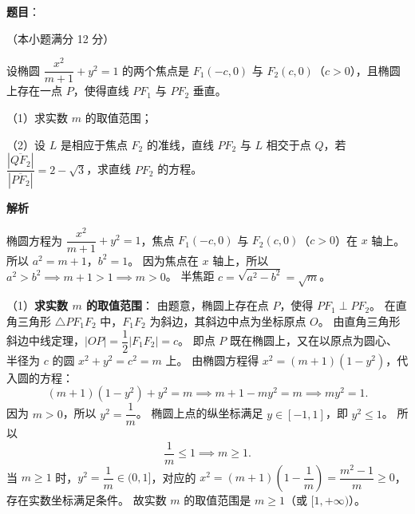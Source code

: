 \begin{answer}

\textbf{题目}：

（本小题满分 12 分）

设椭圆 $\dfrac{x^2}{m+1}+y^2=1$ 的两个焦点是 $F_1(-c,0)$ 与 $F_2(c,0)$（$c>0$），且椭圆上存在一点 $P$，使得直线 $PF_1$ 与 $PF_2$ 垂直。

（1）求实数 $m$ 的取值范围；

（2）设 $L$ 是相应于焦点 $F_2$ 的准线，直线 $PF_2$ 与 $L$ 相交于点 $Q$，若 $\dfrac{|\overline{QF_2}|}{|\overline{PF_2}|}=2-\sqrt{3}$，求直线 $PF_2$ 的方程。

\textbf{解析}

椭圆方程为 $\dfrac{x^2}{m+1}+y^2=1$，焦点 $F_1(-c,0)$ 与 $F_2(c,0)$（$c>0$）在 $x$ 轴上。
所以 $a^2=m+1$，$b^2=1$。
因为焦点在 $x$ 轴上，所以 $a^2>b^2 \implies m+1>1 \implies m>0$。
半焦距 $c=\sqrt{a^2-b^2}=\sqrt{m}$。

（1）\textbf{求实数 $m$ 的取值范围}：
由题意，椭圆上存在点 $P$，使得 $PF_1\perp PF_2$。
在直角三角形 $\triangle PF_1F_2$ 中，$F_1F_2$ 为斜边，其斜边中点为坐标原点 $O$。
由直角三角形斜边中线定理，$|OP|=\dfrac{1}{2}|F_1F_2|=c$。
即点 $P$ 既在椭圆上，又在以原点为圆心、半径为 $c$ 的圆 $x^2+y^2=c^2=m$ 上。
由椭圆方程得 $x^2=(m+1)(1-y^2)$，代入圆的方程：
\nopagebreak[4]
\[
(m+1)(1-y^2)+y^2=m \implies m+1-my^2=m \implies my^2=1.
\]
因为 $m>0$，所以 $y^2=\dfrac{1}{m}$。
椭圆上点的纵坐标满足 $y\in[-1,1]$，即 $y^2\leqslant 1$。
所以
\nopagebreak[4]
\[
\frac{1}{m}\leqslant 1 \implies m\geqslant 1.
\]
当 $m\geqslant 1$ 时，$y^2=\dfrac{1}{m}\in(0,1]$，对应的 $x^2=(m+1)\left(1-\dfrac{1}{m}\right)=\dfrac{m^2-1}{m}\geqslant 0$，存在实数坐标满足条件。
故实数 $m$ 的取值范围是 $m\geqslant 1$（或 $[1,+\infty)$）。


\end{answer}
